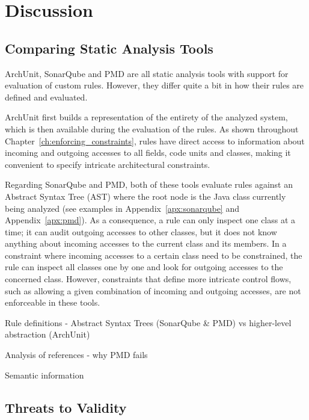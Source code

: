 \chapter{Discussion}


\section{Comparing Static Analysis Tools}
ArchUnit, SonarQube and PMD are all static analysis tools with support for evaluation of custom rules. However, they differ quite a bit in how their rules are defined and evaluated.

ArchUnit first builds a representation of the entirety of the analyzed system, which is then available during the evaluation of the rules. As shown throughout Chapter~\ref{ch:enforcing_constraints}, rules have direct access to information about incoming and outgoing accesses to all fields, code units and classes, making it convenient to specify intricate architectural constraints.

Regarding SonarQube and PMD, both of these tools evaluate rules against an Abstract Syntax Tree (AST) where the root node is the Java class currently being analyzed (see examples in Appendix~\ref{apx:sonarqube} and Appendix~\ref{apx:pmd}). As a consequence, a rule can only inspect one class at a time; it can audit outgoing accesses to other classes, but it does not know anything about incoming accesses to the current class and its members.
In a constraint where incoming accesses to a certain class need to be constrained, the rule can inspect all classes one by one and look for outgoing accesses to the concerned class. However, constraints that define more intricate control flows, such as allowing a given combination of incoming and outgoing accesses, are not enforceable in these tools.

Rule definitions - Abstract Syntax Trees (SonarQube \& PMD) vs higher-level abstraction (ArchUnit)

Analysis of references - why PMD fails

Semantic information

\section{Threats to Validity}

